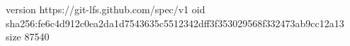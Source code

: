 version https://git-lfs.github.com/spec/v1
oid sha256:fe6c4d912c0ea2da1d7543635c5512342dff3f353029568f332473ab9cc12a13
size 87540
